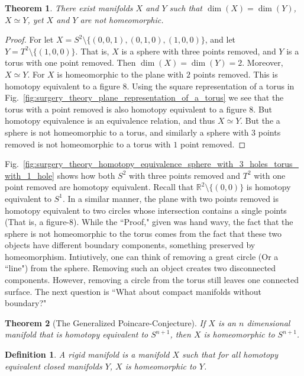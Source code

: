 \documentclass[oneside]{book}
\theoremstyle{mystyle}
\newtheorem{theorem}{Theorem}[section]
\newtheorem{definition}{Definition}[section]
\begin{document}
\begin{theorem}
There exist manifolds $X$ and $Y$ such that $\dim(X) = \dim(Y)$, $X\simeq Y$, yet $X$ and $Y$ are not homeomorphic.
\end{theorem}
\begin{proof}
For let $X = S^{2}\setminus\{(0,0,1),(0,1,0),(1,0,0)\}$, and let $Y = T^{2}\setminus\{(1,0,0)\}$. That is, $X$ is a sphere with three points removed, and $Y$ is a torus with one point removed. Then $\dim(X) = \dim(Y) = 2$. Moreover, $X\simeq Y$. For $X$ is homeomorphic to the plane with $2$ points removed. This is homotopy equivalent to a figure $8$. Using the square representation of a torus in Fig.~\ref{fig:surgery_theory_plane_representation_of_a_torus} we see that the torus with a point removed is also homotopy equivalent to a figure $8$. But homotopy equivalence is an equivalence relation, and thus $X\simeq Y$. But the a sphere is not homeomorphic to a torus, and similarly a sphere with $3$ points removed is not homeomorphic to a torus with $1$ point removed.
\end{proof}
Fig.~\ref{fig:surgery_theory_homotopy_equivalence_sphere_with_3_holes_torus_with_1_hole} shows how both $S^{2}$ with three points removed and $T^{2}$ with one point removed are homotopy equivalent. Recall that $\mathbb{R}^{2}\setminus \{(0,0)\}$ is homotopy equivalent to $S^{1}$. In a similar manner, the plane with two points removed is homotopy equivalent to two circles whose intersection contains a single points (That is, a figure-$8$). While the ``Proof," given was hand wavy, the fact that the sphere is not homeomorphic to the torus comes from the fact that these two objects have different boundary components, something preserved by homeomorphism. Intiutively, one can think of removing a great circle (Or a ``line") from the sphere. Removing such an object creates two disconnected components. However, removing a circle from the torus still leaves one connected surface. The next question is ``What about compact manifolds without boundary?"
\begin{theorem}[The Generalized Poincare-Conjecture]
If $X$ is an $n$ dimensional manifold that is homotopy equivalent to $S^{n+1}$, then $X$ is homeomorphic to $S^{n+1}$.
\end{theorem}
\begin{definition}
A rigid manifold is a manifold $X$ such that for all homotopy equivalent closed manifolds $Y$, $X$ is homeomorphic to $Y$.
\end{definition}
\end{document}
